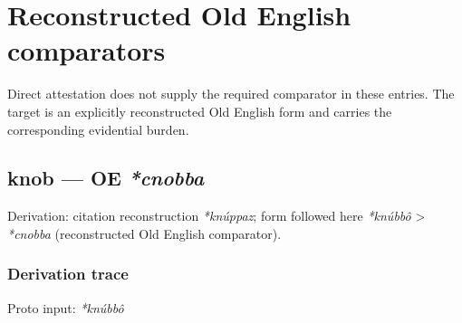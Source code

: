\documentclass[
  british,
  a4paper,
  openany]{book}
\providecommand{\texorpdfstring}[2]{#1}
\begin{document}
\clearpage

\chapter{Reconstructed Old English
comparators}\label{reconstructed-old-english-comparators}

Direct attestation does not supply the required comparator in these
entries. The target is an explicitly reconstructed Old English form and
carries the corresponding evidential burden.

\section{\texorpdfstring{knob --- OE
\emph{*cnobba}}{knob --- OE *cnobba}}\label{knob-oe-cnobba}


Derivation: citation reconstruction \emph{*knúppaz}; form followed here
\emph{*knúbbô} \textgreater{} \emph{*cnobba} (reconstructed Old English
comparator).

\subsection{Derivation trace}\label{derivation-trace-136}

Proto input: \emph{*knúbbô}

\begingroup
\setlength{\fboxsep}{6pt}
\end{document}
